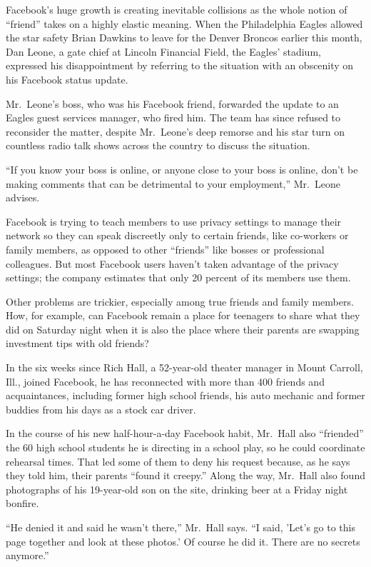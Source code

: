 \documentclass[12pt,a4paper,onecolumn]{article}
\begin{document}
Facebook's huge growth is creating inevitable collisions as the whole notion of ``friend'' takes on
a highly elastic meaning. When the Philadelphia Eagles allowed the star safety Brian Dawkins to
leave for the Denver Broncos earlier this month, Dan Leone, a gate chief at Lincoln Financial Field,
the Eagles' stadium, expressed his disappointment by referring to the situation with an obscenity on
his Facebook status update.

Mr.~Leone's boss, who was his Facebook friend, forwarded the update to an Eagles guest services
manager, who fired him. The team has since refused to reconsider the matter, despite Mr.~Leone's
deep remorse and his star turn on countless radio talk shows across the country to discuss the
situation.

``If you know your boss is online, or anyone close to your boss is online, don't be making comments
that can be detrimental to your employment,'' Mr.~Leone advises.

Facebook is trying to teach members to use privacy settings to manage their network so they can
speak discreetly only to certain friends, like co-workers or family members, as opposed to other
``friends'' like bosses or professional colleagues. But most Facebook users haven't taken advantage
of the privacy settings; the company estimates that only 20 percent of its members use them.

Other problems are trickier, especially among true friends and family members. How, for example, can
Facebook remain a place for teenagers to share what they did on Saturday night when it is also the
place where their parents are swapping investment tips with old friends?

In the six weeks since Rich Hall, a 52-year-old theater manager in Mount Carroll, Ill., joined
Facebook, he has reconnected with more than 400 friends and acquaintances, including former high
school friends, his auto mechanic and former buddies from his days as a stock car driver.

In the course of his new half-hour-a-day Facebook habit, Mr.~Hall also ``friended'' the 60 high
school students he is directing in a school play, so he could coordinate rehearsal times. That led
some of them to deny his request because, as he says they told him, their parents ``found it
creepy.'' Along the way, Mr.~Hall also found photographs of his 19-year-old son on the site,
drinking beer at a Friday night bonfire.

``He denied it and said he wasn't there,'' Mr.~Hall says. ``I said, 'Let's go to this page together
and look at these photos.' Of course he did it. There are no secrets anymore.''
\end{document}
